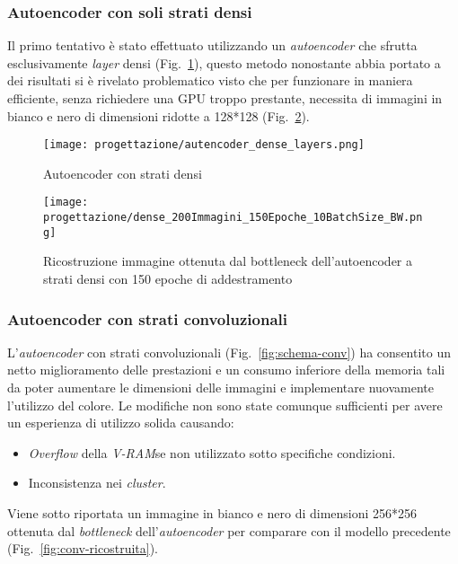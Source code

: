 \subsubsection{Autoencoder con soli strati densi}
Il primo tentativo è stato effettuato utilizzando un \emph{autoencoder} che sfrutta esclusivamente \emph{layer} densi (Fig.~\ref{fig:schema-denso}), questo metodo nonostante abbia portato a dei risultati si è rivelato problematico visto che per funzionare in maniera efficiente, senza richiedere una GPU troppo prestante, necessita di immagini in bianco e nero di dimensioni ridotte a 128*128 (Fig.~\ref{fig:dense-ricostruita}).

\begin{figure}[!h] 
  \centering 
  \texttt{[image: progettazione/autencoder\_dense\_layers.png]} 
  \caption{Autoencoder con strati densi}
  \label{fig:schema-denso}
\end{figure}


\begin{figure}[!h] 
  \centering 
  \texttt{[image: progettazione/dense\_200Immagini\_150Epoche\_10BatchSize\_BW.png]} 
  \caption{Ricostruzione immagine ottenuta dal bottleneck dell'autoencoder a strati densi con 150 epoche di addestramento}
  \label{fig:dense-ricostruita}
\end{figure}

\newpage

\subsubsection{Autoencoder con strati convoluzionali}
L'\emph{autoencoder} con strati convoluzionali (Fig.~\ref{fig:schema-conv}) ha consentito un netto miglioramento delle prestazioni e un consumo inferiore della memoria tali da poter aumentare le dimensioni delle immagini e implementare nuovamente l'utilizzo del colore.
Le modifiche non sono state comunque sufficienti per avere un esperienza di utilizzo solida causando:
\begin{itemize}
  \item \emph{Overflow} della \emph{V-RAM}\glsfirstoccur se non utilizzato sotto specifiche condizioni.
  \item Inconsistenza nei \emph{cluster}.
\end{itemize}
Viene sotto riportata un immagine in bianco e nero di dimensioni 256*256 ottenuta dal \emph{bottleneck} dell'\emph{autoencoder} per comparare con il modello precedente (Fig.~\ref{fig:conv-ricostruita}).


